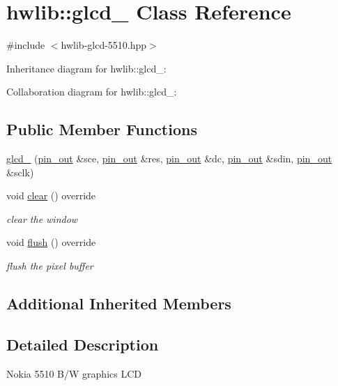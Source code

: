 \hypertarget{classhwlib_1_1glcd__5510}{}\section{hwlib\+:\+:glcd\+\_ Class Reference}
\label{classhwlib_1_1glcd__5510}


{\ttfamily \#include $<$hwlib-\/glcd-\/5510.\+hpp$>$}



Inheritance diagram for hwlib\+:\+:glcd\+\_\+:


Collaboration diagram for hwlib\+:\+:glcd\+\_\+:
\subsection*{Public Member Functions}
\begin{DoxyCompactItemize}
\item 
\hyperlink{classhwlib_1_1glcd__5510_a689cb8a2f60f76f087b83626b2ca931a}{glcd\+\_} (\hyperlink{classhwlib_1_1pin__out}{pin\+\_\+out} \&sce, \hyperlink{classhwlib_1_1pin__out}{pin\+\_\+out} \&res, \hyperlink{classhwlib_1_1pin__out}{pin\+\_\+out} \&dc, \hyperlink{classhwlib_1_1pin__out}{pin\+\_\+out} \&sdin, \hyperlink{classhwlib_1_1pin__out}{pin\+\_\+out} \&sclk)
\item 
void \hyperlink{classhwlib_1_1glcd__5510_a533b2663e151bee909543d0038b2cb4d}{clear} () override
\begin{DoxyCompactList}\small\item\em clear the window \end{DoxyCompactList}\item 
void \hyperlink{classhwlib_1_1glcd__5510_ac53cb29b0973166ae3f54940a71317bf}{flush} () override
\begin{DoxyCompactList}\small\item\em flush the pixel buffer \end{DoxyCompactList}\end{DoxyCompactItemize}
\subsection*{Additional Inherited Members}


\subsection{Detailed Description}
Nokia 5510 B/W graphics L\+CD

